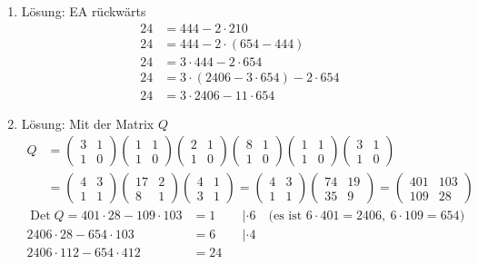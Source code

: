 \begin{loesung}
\begin{enumerate}
\item Lösung: EA rückwärts
\begin{align*}
24 &= 444 - 2 \cdot 210\\
24 &= 444 - 2 \cdot (654 - 444)\\
24 &= 3 \cdot 444 - 2 \cdot 654\\
24 &= 3 \cdot (2406 - 3 \cdot 654) - 2 \cdot 654\\
24 &= 3 \cdot 2406 - 11 \cdot 654
\end{align*}
\item Lösung: Mit der Matrix $Q$
\begin{align*}
Q &= \begin{pmatrix} 3 & 1\\ 1 & 0\end{pmatrix}
\begin{pmatrix} 1 & 1\\ 1 & 0\end{pmatrix}
\begin{pmatrix} 2 & 1\\ 1 & 0\end{pmatrix}
\begin{pmatrix} 8 & 1\\ 1 & 0\end{pmatrix}
\begin{pmatrix} 1 & 1\\ 1 & 0\end{pmatrix}
\begin{pmatrix} 3 & 1\\ 1 & 0\end{pmatrix}\\
&= \begin{pmatrix} 4 & 3\\ 1 & 1\end{pmatrix}
\begin{pmatrix} 17 & 2\\ 8 & 1\end{pmatrix}
\begin{pmatrix} 4 & 1\\ 3 & 1\end{pmatrix}
= \begin{pmatrix} 4 & 3\\ 1 & 1\end{pmatrix}
\begin{pmatrix} 74 & 19\\ 35 & 9\end{pmatrix}
= \begin{pmatrix} 401 & 103\\ 109 & 28\end{pmatrix}
\end{align*}
\begin{align*}
\operatorname{Det} Q = 401 \cdot 28 - 109 \cdot 103 &= 1 && | \cdot 6 \quad \text{(es ist } 6 \cdot 401 = 2406,\ 6 \cdot 109 = 654\text{)}\\
2406 \cdot 28 - 654 \cdot 103 &= 6 && | \cdot 4\\
2406 \cdot 112 - 654 \cdot 412 &= 24
\end{align*}
\end{enumerate}


\end{loesung}
